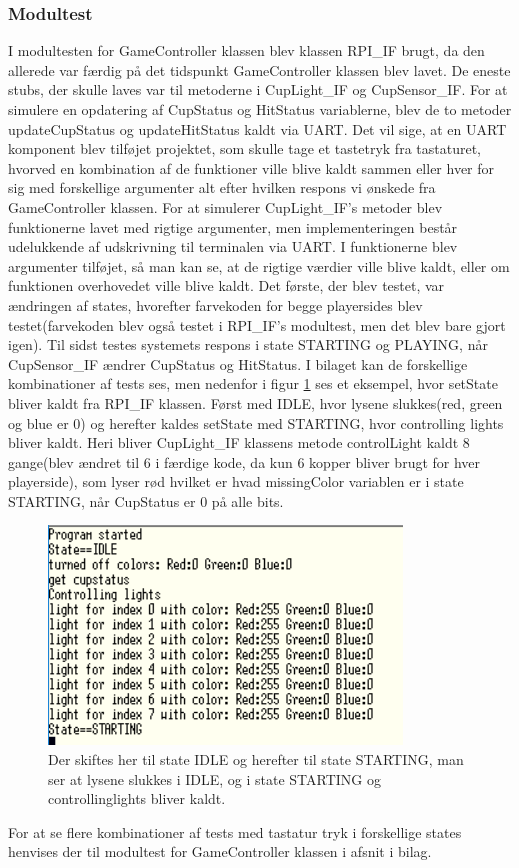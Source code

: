 \documentclass[Rapport/Playerside/GameController/GameController.tex]{subfiles}
\begin{document}
\subsubsection{Modultest}
I modultesten for GameController klassen blev klassen RPI\_IF brugt, da den allerede var færdig på det tidspunkt GameController klassen blev lavet. De eneste stubs, der skulle laves var til metoderne i CupLight\_IF og CupSensor\_IF. For at simulere en opdatering af CupStatus og HitStatus variablerne, blev de to metoder updateCupStatus og updateHitStatus kaldt via UART. Det vil sige, at en UART komponent blev tilføjet projektet, som skulle tage et tastetryk fra tastaturet, hvorved en kombination af de funktioner ville blive kaldt sammen eller hver for sig med forskellige argumenter alt efter hvilken respons vi ønskede fra GameController klassen. For at simulerer CupLight\_IF's metoder blev funktionerne lavet med rigtige argumenter, men implementeringen består udelukkende af udskrivning til terminalen via UART. I funktionerne blev argumenter tilføjet, så man kan se, at de rigtige værdier ville blive kaldt, eller om funktionen overhovedet ville blive kaldt. Det første, der blev testet, var ændringen af states, hvorefter farvekoden for begge playersides blev testet(farvekoden blev også testet i RPI\_IF's modultest, men det blev bare gjort igen). Til sidst testes systemets respons i state STARTING og PLAYING, når CupSensor\_IF ændrer CupStatus og HitStatus. I bilaget kan de forskellige kombinationer af tests ses, men nedenfor i figur \ref{fig:IDLE_STARTING} ses et eksempel, hvor setState bliver kaldt fra RPI\_IF klassen. Først med IDLE, hvor lysene slukkes(red, green og blue er 0) og herefter kaldes setState med STARTING, hvor controlling lights bliver kaldt. Heri bliver CupLight\_IF klassens metode controlLight kaldt 8 gange(blev ændret til 6 i færdige kode, da kun 6 kopper bliver brugt for hver playerside), som lyser rød hvilket er hvad missingColor variablen er i state STARTING, når CupStatus er 0 på alle bits.
\begin{figure}
    \centering 
    \includegraphics[width=0.5\linewidth]{Rapport/Playerside/graphics/GameController/IDLE_STARTING.PNG}
    \caption{Der skiftes her til state IDLE og herefter til state STARTING, man ser at lysene slukkes i IDLE, og i state STARTING og controllinglights bliver kaldt.}
    \label{fig:IDLE_STARTING}
\end{figure}
For at se flere kombinationer af tests med tastatur tryk i forskellige states henvises der til modultest for GameController klassen i afsnit  i bilag.
\end{document}
